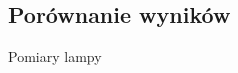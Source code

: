 \documentclass[a4paper,12pt]{extarticle}  %
\begin{document}
\subsection{Porównanie wyników}
\begin{center}
	Pomiary lampy
\end{center}
\begin{minipage}[c]{0.49\linewidth}
	\begin{figure}[H]
	   \centering
	\end{figure}
\end{minipage}
\begin{minipage}[c]{0.49\linewidth}
	\begin{figure}[H]
	   \centering
	\end{figure}
\end{minipage}
\end{document}
